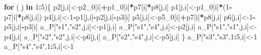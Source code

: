 \documentclass[
]{article}
\newenvironment{Shaded}{\begin{snugshade}}{\end{snugshade}}
\newcommand{\ControlFlowTok}[1]{\textcolor[rgb]{0.13,0.29,0.53}{\textbf{#1}}}
\newcommand{\DecValTok}[1]{\textcolor[rgb]{0.00,0.00,0.81}{#1}}
\newcommand{\NormalTok}[1]{#1}
\newcommand{\OperatorTok}[1]{\textcolor[rgb]{0.81,0.36,0.00}{\textbf{#1}}}
\newcommand{\StringTok}[1]{\textcolor[rgb]{0.31,0.60,0.02}{#1}}
\begin{document}
\begin{Shaded}
\begin{Highlighting}[]
{    \ControlFlowTok{for}\NormalTok{ ( j }\ControlFlowTok{in} \DecValTok{1}\OperatorTok{:}\DecValTok{5}\NormalTok{)\{}
\NormalTok{      p2[j,i]<-p2_}\DecValTok{0}\NormalTok{[i]}\OperatorTok{+}\NormalTok{p1_}\DecValTok{0}\NormalTok{[i]}\OperatorTok{*}\NormalTok{p7[i]}\OperatorTok{*}\NormalTok{p8[j,i]}
\NormalTok{      p1[j,i]<-p1_}\DecValTok{0}\NormalTok{[i]}\OperatorTok{*}\NormalTok{(}\DecValTok{1}\OperatorTok{-}\NormalTok{p7[i]}\OperatorTok{*}\NormalTok{p8[j,i])}
\NormalTok{      p4[j,i]<-}\DecValTok{1}\OperatorTok{-}\NormalTok{p1[j,i]}\OperatorTok{-}\NormalTok{p2[j,i]}\OperatorTok{-}\NormalTok{p3[i]}
\NormalTok{      p5[j,i]<-p5_}\DecValTok{0}\NormalTok{[i]}\OperatorTok{+}\NormalTok{p7[i]}\OperatorTok{*}\NormalTok{p8[j,i]}
\NormalTok{      p6[j,i]<-}\DecValTok{1}\OperatorTok{-}\NormalTok{p5[j,i]}\OperatorTok{-}\NormalTok{p3[i]}
\NormalTok{      a_P[}\StringTok{"s1"}\NormalTok{,}\StringTok{"s2"}\NormalTok{,j,i]<-p1[j,i]}
\NormalTok{      a_P[}\StringTok{"s1"}\NormalTok{,}\StringTok{"s4"}\NormalTok{,j,i]<-p2[j,i]}
\NormalTok{      a_P[}\StringTok{"s1"}\NormalTok{,}\StringTok{"s1"}\NormalTok{,j,i]<-p4[j,i]}
\NormalTok{      a_P[}\StringTok{"s2"}\NormalTok{,}\StringTok{"s2"}\NormalTok{,j,i]<-p6[j,i]}
\NormalTok{      a_P[}\StringTok{"s2"}\NormalTok{,}\StringTok{"s4"}\NormalTok{,j,i]<-p5[j,i]}
\NormalTok{    \}}
\NormalTok{    a_P[}\StringTok{"s3"}\NormalTok{,}\StringTok{"s3"}\NormalTok{,}\DecValTok{1}\OperatorTok{:}\DecValTok{5}\NormalTok{,i]<-}\DecValTok{1}
\NormalTok{    a_P[}\StringTok{"s4"}\NormalTok{,}\StringTok{"s4"}\NormalTok{,}\DecValTok{1}\OperatorTok{:}\DecValTok{5}\NormalTok{,i]<-}\DecValTok{1}
    
}
\end{Highlighting}
\end{Shaded}
\end{document}
